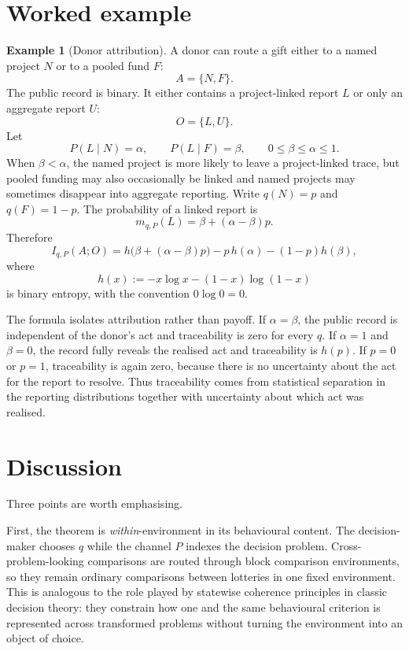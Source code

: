 \documentclass[11pt,a4paper]{article}
\theoremstyle{definition}
\newtheorem{example}[theorem]{Example}
\newcommand{\1}{\mathbf 1}
\begin{document}
\section*{Worked example}

\begin{example}[Donor attribution]\label{ex:donor-attribution}
A donor can route a gift either to a named project $N$ or to a pooled fund $F$:
\[
A=\{N,F\}.
\]
The public record is binary.  It either contains a project-linked report $L$ or only an aggregate report $U$:
\[
O=\{L,U\}.
\]
Let
\[
P(L\mid N)=\alpha,\qquad P(L\mid F)=\beta,
\qquad 0\le \beta\le \alpha\le 1.
\]
When $\beta<\alpha$, the named project is more likely to leave a project-linked trace, but pooled funding may also
occasionally be linked and named projects may sometimes disappear into aggregate reporting.  Write $q(N)=p$ and
$q(F)=1-p$.  The probability of a linked report is
\[
m_{q,P}(L)=\beta+(\alpha-\beta)p.
\]
Therefore
\[
I_{q,P}(A;O)
=
h\!\big(\beta+(\alpha-\beta)p\big)
-p\,h(\alpha)-(1-p)h(\beta),
\]
where
\[
h(x):=-x\log x-(1-x)\log(1-x)
\]
is binary entropy, with the convention $0\log0=0$.

The formula isolates attribution rather than payoff.  If $\alpha=\beta$, the public record is independent of the donor's
act and traceability is zero for every $q$.  If $\alpha=1$ and $\beta=0$, the record fully reveals the realised act and
traceability is $h(p)$.  If $p=0$ or $p=1$, traceability is again zero, because there is no uncertainty about the act for
the report to resolve.  Thus traceability comes from statistical separation in the reporting distributions together with
uncertainty about which act was realised.
\end{example}

\section*{Discussion}

Three points are worth emphasising.

First, the theorem is \emph{within}-environment in its behavioural content.  The decision-maker chooses $q$ while the
channel $P$ indexes the decision problem.  Cross-problem-looking comparisons are routed through block comparison
environments, so they remain ordinary comparisons between lotteries in one fixed environment.  This is analogous to the
role played by statewise coherence principles in classic decision theory: they constrain how one and the same behavioural
criterion is represented across transformed problems without turning the environment into an object of choice.
\end{document}
